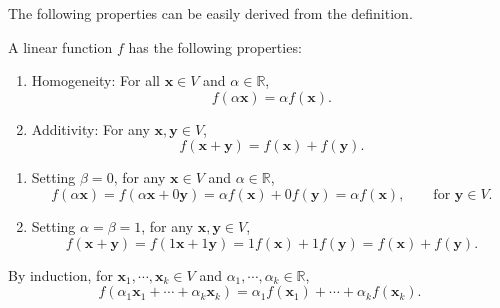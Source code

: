 \documentclass{huhtakm-template-book-v2}
\begin{document}
    The following properties can be easily derived from the definition.
    \begin{thm}
        A linear function $f$ has the following properties:
        \begin{enumerate}
            \item Homogeneity: For all $\mathbf{x}\in V$ and $\alpha\in\mathbb{R}$,
            \begin{equation*}
                f(\alpha\mathbf{x})=\alpha f(\mathbf{x}).
            \end{equation*}
            \item Additivity: For any $\mathbf{x},\mathbf{y}\in V$,
            \begin{equation*}
                f(\mathbf{x}+\mathbf{y})=f(\mathbf{x})+f(\mathbf{y}).
            \end{equation*}
        \end{enumerate}
    \end{thm}
    \begin{proofing}
        \begin{enumerate}
            \item Setting $\beta=0$, for any $\mathbf{x}\in V$ and $\alpha\in\mathbb{R}$,
            \begin{equation*}
                f(\alpha\mathbf{x})=f(\alpha\mathbf{x}+0\mathbf{y})=\alpha f(\mathbf{x})+0f(\mathbf{y})=\alpha f(\mathbf{x}), \qquad \text{for } \mathbf{y}\in V.
            \end{equation*}
            \item Setting $\alpha=\beta=1$, for any $\mathbf{x},\mathbf{y}\in V$,
            \begin{equation*}
                f(\mathbf{x}+\mathbf{y})=f(1\mathbf{x}+1\mathbf{y})=1f(\mathbf{x})+1f(\mathbf{y})=f(\mathbf{x})+f(\mathbf{y}).
            \end{equation*}
        \end{enumerate}
    \end{proofing}
    \begin{rem}
        By induction, for $\mathbf{x}_{1},\cdots,\mathbf{x}_{k}\in V$ and $\alpha_{1},\cdots,\alpha_{k}\in \mathbb{R}$,
        \begin{equation*}
            f(\alpha_{1}\mathbf{x}_{1}+\cdots+\alpha_{k}\mathbf{x}_{k})=\alpha_{1}f(\mathbf{x}_{1})+\cdots+\alpha_{k}f(\mathbf{x}_{k}).
        \end{equation*}
    \end{rem}
    \newpage
\end{document}

